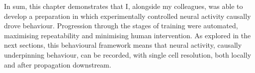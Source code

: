 In sum, this chapter demonstrates that I, alongside my colleagues, was able to develop a preparation in which experimentally controlled neural activity causally drove behaviour. Progression through the stages of training were automated, maximising repeatability and minimising human intervention. As explored in the next sections, this behavioural framework means that neural activity, causally underpinning behaviour, can be recorded, with single cell resolution, both locally and after propagation downstream.